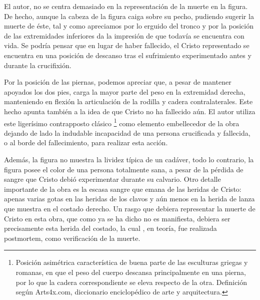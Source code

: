 El autor, no se centra demasiado en la representación de la muerte en la figura. De hecho, aunque la cabeza de la figura caiga sobre su pecho, pudiendo sugerir la muerte de éste, tal y como apreciamos por lo erguido del tronco y por la posición de las extremidades inferiores da la impresión de que todavía se encuentra con vida. Se podría pensar que en lugar de haber fallecido, el Cristo representado se encuentra en una posición de descanso tras el sufrimiento experimentado antes y durante la crucifixión. %

Por la posición de las piernas, podemos apreciar que, a pesar de mantener apoyados los dos pies, carga la mayor parte del peso en la extremidad derecha, manteniendo en flexión la articulación de la rodilla y cadera contralaterales. Este hecho apunta también a la idea de que
Cristo no ha fallecido aún. El autor utiliza este ligerísimo contrapposto clásico \footnote{Posición asimétrica característica de buena parte de las esculturas griegas y romanas, en que el peso del cuerpo descansa principalmente en una pierna, por lo que la cadera correspondiente se eleva respecto de la otra. Definición según Arts4x.com, diccionario enciclopédico de arte y arquitectura.} %
como elemento embellecedor de la obra dejando de lado la indudable incapacidad de una persona crucificada y fallecida, o al borde del fallecimiento, para realizar esta acción.

Además, la figura no muestra la lividez típica de un cadáver, todo lo contrario, la figura posee el color de una persona totalmente sana, a pesar de la pérdida de sangre que Cristo debió experimentar durante su calvario. Otro detalle importante de la obra es la escasa sangre que emana de las heridas de Cristo: apenas varias gotas en las heridas de los clavos y aún menos en la herida de lanza que muestra en el costado derecho. Un rasgo que debiera representar la muerte de Cristo en esta obra, que como ya se ha dicho no es manifiesta, debiera ser precisamente esta herida del costado, la cual%
, en teoría, fue realizada postmortem, como verificación de la muerte.

